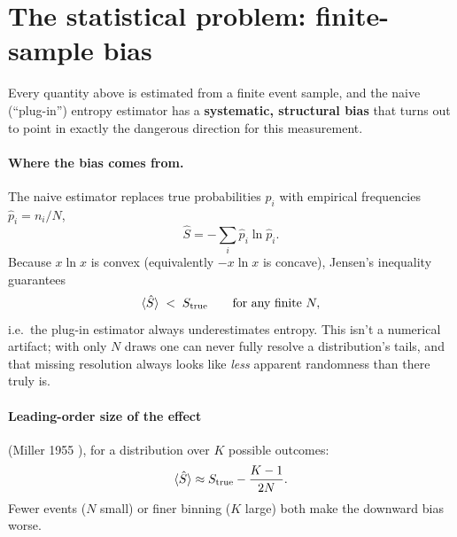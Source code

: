 \documentclass[11pt]{article}
\newcommand{\Strue}{S_{\rm true}}
\begin{document}
\section{The statistical problem: finite-sample bias}
\label{sec:bias}

Every quantity above is estimated from a finite event sample, and the
naive (``plug-in'') entropy estimator has a \textbf{systematic, structural
bias} that turns out to point in exactly the dangerous direction for this
measurement.

\paragraph{Where the bias comes from.} The naive estimator replaces true
probabilities $p_i$ with empirical frequencies $\hat p_i=n_i/N$,
\begin{equation}
\hat S = -\sum_i \hat p_i \ln \hat p_i .
\end{equation}
Because $x\ln x$ is convex (equivalently $-x\ln x$ is concave), Jensen's
inequality guarantees
\begin{equation}
\langle \hat S \rangle \;<\; \Strue \qquad \text{for any finite } N,
\end{equation}
i.e.\ the plug-in estimator always underestimates entropy. This isn't a
numerical artifact; with only $N$ draws one can never fully resolve a
distribution's tails, and that missing resolution always looks like
\emph{less} apparent randomness than there truly is.

\paragraph{Leading-order size of the effect} (Miller 1955
\cite{Miller1955}), for a distribution over $K$ possible outcomes:
\begin{equation}
\langle \hat S \rangle \approx \Strue - \frac{K-1}{2N}.
\end{equation}
Fewer events ($N$ small) or finer binning ($K$ large) both make the
downward bias worse.
\end{document}
